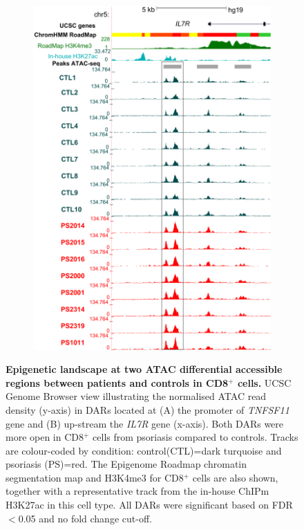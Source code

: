 \begin{figure}[htbp]
\begin{subfigure}{0.6\textwidth}
\includegraphics[width=\textwidth]{./Results2/pdfs/UCSC_ATAC_CD8_normalised_peak_enh_IL7R}
\caption{\textbf{}}
\end{subfigure}
\caption[Epigenetic landscape at two ATAC differential accessible regions between patients and controls in CD8$^+$ cells.]{\textbf{Epigenetic landscape at two ATAC differential accessible regions between patients and controls in CD8$^+$ cells.} UCSC Genome Browser view illustrating the normalised ATAC read density (y-axis) in DARs located at (A) the promoter of \textit{TNFSF11} gene and (B) up-stream the \textit{IL7R} gene (x-axis). Both DARs were more open in CD8$^+$ cells from psoriasis compared to controls. Tracks are colour-coded by condition: control(CTL)=dark turquoise and psoriasis (PS)=red. The Epigenome Roadmap chromatin segmentation map and H3K4me3 for CD8$^+$ cells are also shown, together with a representative track from the in-house ChIPm H3K27ac in this cell type. All DARs were significant based on FDR$<$0.05 and no fold change cut-off.}
\label{figure:ATAC_PS_CTL_CD8_TNFSF11_IL7R_tracks}
\end{figure} 



